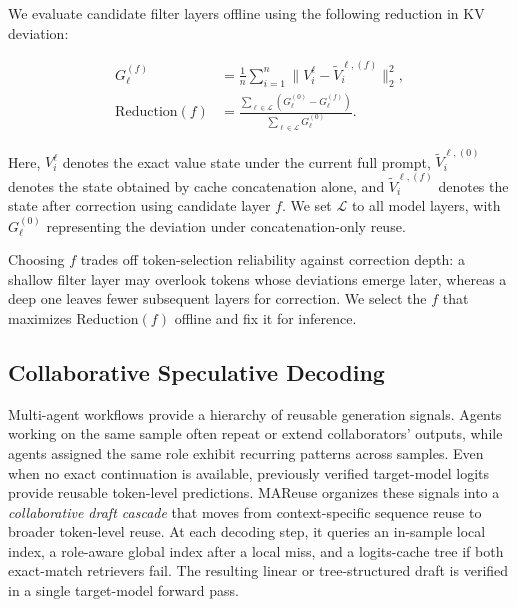 \documentclass[letterpaper]{article} %
\begin{document}
We evaluate candidate filter layers offline using the following reduction in KV deviation:

\begin{equation}
	\begin{aligned}
		G_\ell^{(f)}
		&=\frac{1}{n}\sum_{i=1}^{n}
		\|V_i^\ell-\tilde V_i^{\ell,(f)}\|_2^2,\\
		\mathrm{Reduction}(f)
		&=\frac{\sum_{\ell\in\mathcal L}
			(G_\ell^{(0)}-G_\ell^{(f)})}
		{\sum_{\ell\in\mathcal L}G_\ell^{(0)}}.
	\end{aligned}
\end{equation}

Here, $V_i^\ell$ denotes the exact value state under the current full prompt,
$\tilde V_i^{\ell,(0)}$ denotes the state obtained by cache concatenation alone,
and $\tilde V_i^{\ell,(f)}$ denotes the state after correction using candidate
layer $f$. We set $\mathcal L$ to all model layers, with $G_\ell^{(0)}$
representing the deviation under concatenation-only reuse.

Choosing $f$ trades off token-selection reliability against correction depth:
a shallow filter layer may overlook tokens whose deviations emerge later,
whereas a deep one leaves fewer subsequent layers for correction. We select
the $f$ that maximizes $\mathrm{Reduction}(f)$ offline and fix it for inference.

\subsection{Collaborative Speculative Decoding}
Multi-agent workflows provide a hierarchy of reusable generation signals. Agents working on the same sample often repeat or extend collaborators' outputs, while agents assigned the same role exhibit recurring patterns across samples. Even when no exact continuation is available, previously verified target-model logits provide reusable token-level predictions. MAReuse organizes these signals into a \emph{collaborative draft cascade} that moves from context-specific sequence reuse to broader token-level reuse. At each decoding step, it queries an in-sample local index, a role-aware global index after a local miss, and a logits-cache tree if both exact-match retrievers fail. The resulting linear or tree-structured draft is verified in a single target-model forward pass.
\end{document}
